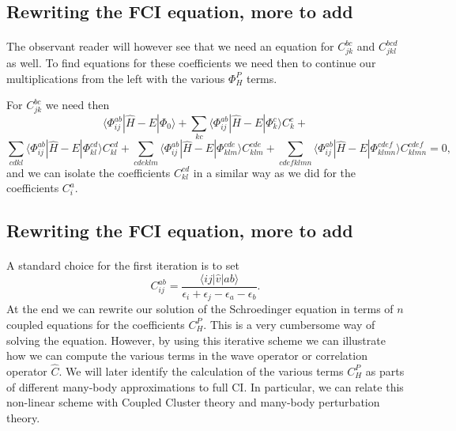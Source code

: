 \documentclass[%
oneside,                 %
final,                   %
10pt]{article}
\begin{document}
\subsection*{Rewriting the FCI equation, more to add}

\paragraph{}
The observant reader will however see that we need an equation for $C_{jk}^{bc}$ and $C_{jkl}^{bcd}$ as well.
To find equations for these coefficients we need then to continue our multiplications from the left with the various
$\Phi_{H}^P$ terms. 

For $C_{jk}^{bc}$ we need then
\[
\langle \Phi_{ij}^{ab} | \hat{H} -E| \Phi_0\rangle + \sum_{kc}\langle \Phi_{ij}^{ab} | \hat{H} -E|\Phi_{k}^{c} \rangle C_{k}^{c}+
\]
\[
\sum_{cdkl}\langle \Phi_{ij}^{ab} | \hat{H} -E|\Phi_{kl}^{cd} \rangle C_{kl}^{cd}+\sum_{cdeklm}\langle \Phi_{ij}^{ab} | \hat{H} -E|\Phi_{klm}^{cde} \rangle C_{klm}^{cde}+\sum_{cdefklmn}\langle \Phi_{ij}^{ab} | \hat{H} -E|\Phi_{klmn}^{cdef} \rangle C_{klmn}^{cdef}=0,
\]
and we can isolate the coefficients $C_{kl}^{cd}$ in a similar way as we did for the coefficients $C_{i}^{a}$.



\subsection*{Rewriting the FCI equation, more to add}

\paragraph{}
A standard choice for the first iteration is to set 
\[
C_{ij}^{ab} =\frac{\langle ij \vert \hat{v} \vert ab \rangle}{\epsilon_i+\epsilon_j-\epsilon_a-\epsilon_b}.
\]
At the end we can rewrite our solution of the Schroedinger equation in terms of $n$ coupled equations for the coefficients $C_H^P$.
This is a very cumbersome way of solving the equation. However, by using this iterative scheme we can illustrate how we can compute the
various terms in the wave operator or correlation operator $\hat{C}$. We will later identify the calculation of the various terms $C_H^P$
as parts of different many-body approximations to full CI. In particular, we can  relate this non-linear scheme with Coupled Cluster theory and
many-body perturbation theory.
\end{document}
